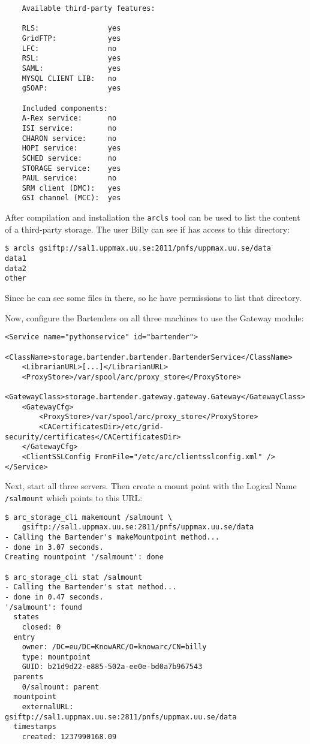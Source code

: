 \documentclass{article}
\begin{document}
\begin{verbatim}
    Available third-party features:

    RLS:                yes
    GridFTP:            yes
    LFC:                no
    RSL:                yes
    SAML:               yes
    MYSQL CLIENT LIB:   no
    gSOAP:              yes

    Included components:
    A-Rex service:      no
    ISI service:        no
    CHARON service:     no
    HOPI service:       yes
    SCHED service:      no
    STORAGE service:    yes
    PAUL service:       no
    SRM client (DMC):   yes
    GSI channel (MCC):  yes
\end{verbatim}

After compilation and installation the \verb!arcls! tool can be used to list the content of a third-party storage. The user Billy can see if has access to this directory:

\begin{verbatim}
$ arcls gsiftp://sal1.uppmax.uu.se:2811/pnfs/uppmax.uu.se/data
data1
data2
other
\end{verbatim}

Since he can see some files in there, so he have permissions to list that directory.

Now, configure the Bartenders on all three machines to use the Gateway module:

\begin{verbatim}
<Service name="pythonservice" id="bartender">
    <ClassName>storage.bartender.bartender.BartenderService</ClassName>
    <LibrarianURL>[...]</LibrarianURL>
    <ProxyStore>/var/spool/arc/proxy_store</ProxyStore>
    <GatewayClass>storage.bartender.gateway.gateway.Gateway</GatewayClass>
    <GatewayCfg>
        <ProxyStore>/var/spool/arc/proxy_store</ProxyStore>
        <CACertificatesDir>/etc/grid-security/certificates</CACertificatesDir>
    </GatewayCfg>
    <ClientSSLConfig FromFile="/etc/arc/clientsslconfig.xml" />
</Service>
\end{verbatim}

Next, start all three servers. Then create a mount point with the Logical Name \verb!/salmount! which points to this URL:

\begin{verbatim}
$ arc_storage_cli makemount /salmount \
    gsiftp://sal1.uppmax.uu.se:2811/pnfs/uppmax.uu.se/data
- Calling the Bartender's makeMountpoint method...
- done in 3.07 seconds.
Creating mountpoint '/salmount': done

$ arc_storage_cli stat /salmount
- Calling the Bartender's stat method...
- done in 0.47 seconds.
'/salmount': found
  states
    closed: 0
  entry
    owner: /DC=eu/DC=KnowARC/O=knowarc/CN=billy
    type: mountpoint
    GUID: b21d9d22-e885-502a-ee0e-bd0a7b967543
  parents
    0/salmount: parent
  mountpoint
    externalURL: gsiftp://sal1.uppmax.uu.se:2811/pnfs/uppmax.uu.se/data
  timestamps
    created: 1237990168.09
\end{verbatim}
\end{document}

